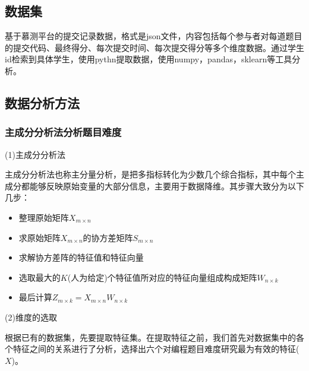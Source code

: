\documentclass[UTF8]{ctexart}
\begin{document}
	\subsection{数据集}
	基于慕测平台的提交记录数据，格式是json文件，内容包括每个参与者对每道题目的提交代码、最终得分、每次提交时间、每次提交得分等多个维度数据。通过学生id检索到具体学生，使用pythn提取数据，使用numpy，pandas，sklearn等工具分析。	
	
	\subsection{数据分析方法}
	
	\subsubsection{主成分分析法分析题目难度}
	\par (1)主成分分析法
	\par 主成分分析法也称主分量分析，是把多指标转化为少数几个综合指标，其中每个主成分都能够反映原始变量的大部分信息，主要用于数据降维。其步骤大致分为以下几步：
	\begin{itemize}
		\item 整理原始矩阵$X_{m \times n}$
		\item 求原始矩阵$X_{m \times n}$的协方差矩阵$S_{m \times n}$
		\item 求解协方差阵的特征值和特征向量
		\item 选取最大的$K$(人为给定)个特征值所对应的特征向量组成构成矩阵$W_{n \times k}$
		\item 最后计算$Z_{m \times k}=X_{m \times n}W_{n \times k}$
	\end{itemize}
	\par (2)维度的选取
	\par 根据已有的数据集，先要提取特征集。在提取特征之前，我们首先对数据集中的各个特征之间的关系进行了分析，选择出六个对编程题目难度研究最为有效的特征($X$)。
	\par
\end{document}
